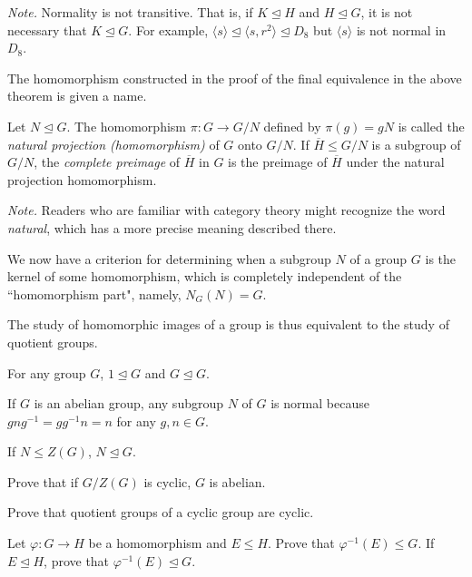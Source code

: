 \textit{Note.}  Normality is not transitive. That is, if $K\unlhd H$ and $H\unlhd G$, it is not necessary that $K\unlhd G$. For example, $\langle s \rangle \unlhd \langle s, r^2 \rangle \unlhd D_8$ but $\langle s\rangle$ is not normal in $D_8$.

\vspace{2mm}
The homomorphism constructed in the proof of the final equivalence in the above theorem is given a name.
\begin{definition}
    Let $N\unlhd G$. The homomorphism $\pi:G\to G/N$ defined by $\pi(g)=gN$ is called the \textit{natural projection (homomorphism)} of $G$ onto $G/N$. If $\overline H\leq G/N$ is a subgroup of $G/N$, the \textit{complete preimage} of $\overline H$ in $G$ is the preimage of $\overline H$ under the natural projection homomorphism.
\end{definition}

\textit{Note.} Readers who are familiar with category theory might recognize the word \textit{natural}, which has a more precise meaning described there.

\vspace{1mm}
We now have a criterion for determining when a subgroup $N$ of a group $G$ is the kernel of some homomorphism, which is completely independent of the ``homomorphism part", namely, $N_G(N)=G$.

\vspace{1mm}
The study of homomorphic images of a group is thus equivalent to the study of quotient groups.

\begin{example}
For any group $G$, $1\unlhd G$ and $G\unlhd G$.

If $G$ is an abelian group, any subgroup $N$ of $G$ is normal because $gng^{-1}=gg^{-1}n=n$ for any $g,n\in G$.

If $N\leq Z(G)$, $N\unlhd G$.
\end{example}

\begin{exercise}
    Prove that if $G/Z(G)$ is cyclic, $G$ is abelian.
\end{exercise}

\begin{exercise}
    Prove that quotient groups of a cyclic group are cyclic.
\end{exercise}

\begin{exercise}
    Let $\varphi:G\to H$ be a homomorphism and $E\leq H$. Prove that $\varphi^{-1}(E)\leq G$. If $E\unlhd H$, prove that $\varphi^{-1}(E)\unlhd G$.
\end{exercise}

